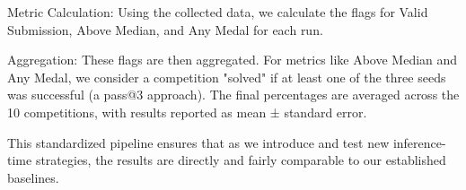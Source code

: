 Metric Calculation: Using the collected data, we calculate the flags for Valid Submission, Above Median, and Any Medal for each run.

Aggregation: These flags are then aggregated. For metrics like Above Median and Any Medal, we consider a competition "solved" if at least one of the three seeds was successful (a pass@3 approach). The final percentages are averaged across the 10 competitions, with results reported as mean ± standard error.

This standardized pipeline ensures that as we introduce and test new inference-time strategies, the results are directly and fairly comparable to our established baselines.%




